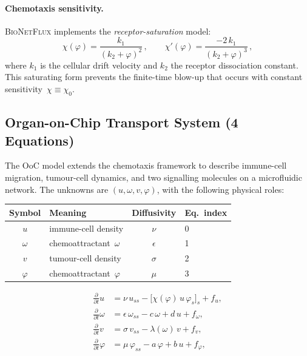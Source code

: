 \documentclass[11pt,a4paper]{article}
\newcommand{\bionetflux}{\textsc{BioNetFlux}}
\newcommand{\ddt}{\frac{\partial}{\partial t}}
\begin{document}
\paragraph{Chemotaxis sensitivity.}
\bionetflux{} implements the \emph{receptor-saturation} model:
\begin{equation}\label{eq:chi}
  \chi(\varphi) = \frac{k_1}{(k_2+\varphi)^2}\,,
  \qquad
  \chi'(\varphi) = \frac{-2\,k_1}{(k_2+\varphi)^3}\,,
\end{equation}
where $k_1$ is the cellular drift velocity and $k_2$ the receptor
dissociation constant.  This saturating form prevents the finite-time
blow-up that occurs with constant sensitivity~$\chi\equiv\chi_0$.

\subsection{Organ-on-Chip Transport System (4 Equations)}

The OoC model extends the chemotaxis framework to describe
immune-cell migration, tumour-cell dynamics, and two signalling
molecules on a microfluidic network.  The unknowns are
$(u,\omega,v,\varphi)$, with the following physical roles:
%
\begin{center}
\begin{tabular}{clcl}
  \toprule
  Symbol & Meaning & Diffusivity & Eq.~index \\
  \midrule
  $u$        & immune-cell density        & $\nu$       & 0 \\
  $\omega$   & chemoattractant~$\omega$   & $\epsilon$  & 1 \\
  $v$        & tumour-cell density        & $\sigma$    & 2 \\
  $\varphi$  & chemoattractant~$\varphi$  & $\mu$       & 3 \\
  \bottomrule
\end{tabular}
\end{center}

\begin{mathbox}[title={Organ-on-Chip system}]
\begin{align}
  \ddt u &= \nu\,u_{ss}
            - \bigl[\chi(\varphi)\,u\,\varphi_s\bigr]_s
            + f_u,
  \label{eq:ooc-u}\\[3pt]
  \ddt\omega &= \epsilon\,\omega_{ss}
                - c\,\omega + d\,u + f_\omega,
  \label{eq:ooc-omega}\\[3pt]
  \ddt v &= \sigma\,v_{ss}
            - \lambda(\omega)\,v + f_v,
  \label{eq:ooc-v}\\[3pt]
  \ddt\varphi &= \mu\,\varphi_{ss}
                 - a\,\varphi + b\,u + f_\varphi,
  \label{eq:ooc-phi}
\end{align}
\end{mathbox}
\end{document}
